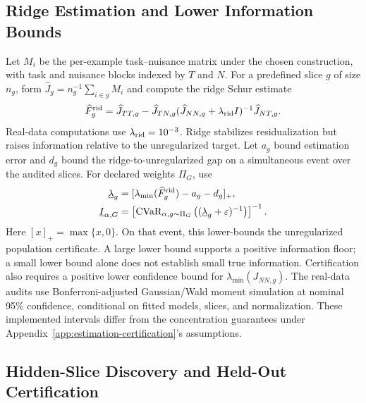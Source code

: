 \subsection{Ridge Estimation and Lower Information Bounds}
\label{sec:stable-estimation}

Let $M_i$ be the per-example task--nuisance matrix under the chosen construction, with task and nuisance blocks indexed by $T$ and $N$. For a predefined slice $g$ of size $n_g$, form $\widehat J_g=n_g^{-1}\sum_{i\in g}M_i$ and compute the ridge Schur estimate
\begin{equation}
\widehat F_g^{\mathrm{rid}}
=\widehat J_{TT,g}-\widehat J_{TN,g}
(\widehat J_{NN,g}+\lambda_{\mathrm{rid}}I)^{-1}\widehat J_{NT,g}.
\label{eq:ridge-estimator}
\end{equation}
Real-data computations use $\lambda_{\mathrm{rid}}=10^{-3}$. Ridge stabilizes residualization but raises information relative to the unregularized target. Let $a_g$ bound estimation error and $d_g$ bound the ridge-to-unregularized gap on a simultaneous event over the audited slices. For declared weights $\Pi_G$, use
\begin{equation}
\begin{aligned}
\underline\lambda_g&=[\lambda_{\min}(\widehat F_g^{\mathrm{rid}})-a_g-d_g]_+,\\
\underline I_{\alpha,G}&=
\left[\operatorname{CVaR}_{\alpha,g\sim\Pi_G}
\left((\underline\lambda_g+\varepsilon)^{-1}\right)\right]^{-1}.
\end{aligned}
\label{eq:lower-certificate}
\end{equation}
Here $[x]_+=\max\{x,0\}$. On that event, this lower-bounds the unregularized population certificate. A large lower bound supports a positive information floor; a small lower bound alone does not establish small true information. Certification also requires a positive lower confidence bound for $\lambda_{\min}(J_{NN,g})$. The real-data audits use Bonferroni-adjusted Gaussian/Wald moment simulation at nominal 95\% confidence, conditional on fitted models, slices, and normalization. These implemented intervals differ from the concentration guarantees under Appendix~\ref{app:estimation-certification}'s assumptions.

\subsection{Hidden-Slice Discovery and Held-Out Certification}
\label{sec:hidden-slice-method}

